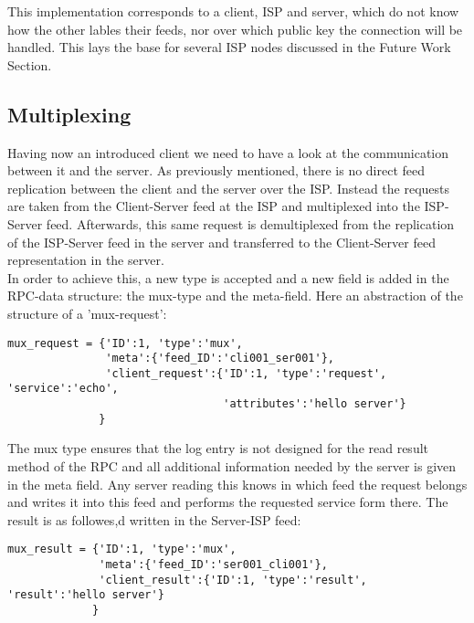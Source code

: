 This implementation corresponds to a client, ISP and server, which do not know how the other lables their feeds, nor over which public key the connection will be handled. This lays the base for several ISP nodes discussed in the Future Work Section. 


\subsection{Multiplexing}
Having now an introduced client we need to have a look at the communication between it and the server. As previously mentioned, there is no direct feed replication between the client and the server over the ISP. Instead the requests are taken from the Client-Server feed at the ISP and multiplexed into the ISP-Server feed. Afterwards, this same request is demultiplexed from the replication of the ISP-Server feed in the server and transferred to the Client-Server feed representation in the server.\\
In order to achieve this, a new type is accepted and a new field is added in the RPC-data structure: the mux-type and the meta-field. Here an abstraction of the structure of a ’mux-request’:\\
\begin{python}
    
\begin{lstlisting}
mux_request = {'ID':1, 'type':'mux', 
               'meta':{'feed_ID':'cli001_ser001'},
               'client_request':{'ID':1, 'type':'request', 'service':'echo', 
                                 'attributes':'hello server'}
              }
\end{lstlisting}
\end{python}

The mux type ensures that the log entry is not designed for the read result method of the RPC and all additional information needed by the server is given in the meta field. Any server reading this knows in which feed the request belongs and writes it into this feed and performs the requested service form there. The result is as followes,d written in the Server-ISP
feed:\\
\begin{python}
    
\begin{lstlisting}
mux_result = {'ID':1, 'type':'mux', 
              'meta':{'feed_ID':'ser001_cli001'},
              'client_result':{'ID':1, 'type':'result', 'result':'hello server'}
             }
\end{lstlisting}
\end{python}

